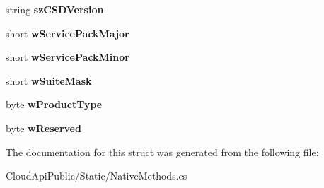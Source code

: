 \begin{DoxyCompactItemize}
\item 
\hypertarget{struct_cloud_api_public_1_1_static_1_1_native_methods_1_1_o_s_v_e_r_s_i_o_n_i_n_f_o_e_x_a8c772de131a2cb6fbf89454b8e3c31dd}{string {\bfseries sz\-C\-S\-D\-Version}}\label{struct_cloud_api_public_1_1_static_1_1_native_methods_1_1_o_s_v_e_r_s_i_o_n_i_n_f_o_e_x_a8c772de131a2cb6fbf89454b8e3c31dd}

\item 
\hypertarget{struct_cloud_api_public_1_1_static_1_1_native_methods_1_1_o_s_v_e_r_s_i_o_n_i_n_f_o_e_x_a70d66e9b3d86a720e90402bc8b2f0dbb}{short {\bfseries w\-Service\-Pack\-Major}}\label{struct_cloud_api_public_1_1_static_1_1_native_methods_1_1_o_s_v_e_r_s_i_o_n_i_n_f_o_e_x_a70d66e9b3d86a720e90402bc8b2f0dbb}

\item 
\hypertarget{struct_cloud_api_public_1_1_static_1_1_native_methods_1_1_o_s_v_e_r_s_i_o_n_i_n_f_o_e_x_aa1a7301bc35700aa81efaace1811fc2f}{short {\bfseries w\-Service\-Pack\-Minor}}\label{struct_cloud_api_public_1_1_static_1_1_native_methods_1_1_o_s_v_e_r_s_i_o_n_i_n_f_o_e_x_aa1a7301bc35700aa81efaace1811fc2f}

\item 
\hypertarget{struct_cloud_api_public_1_1_static_1_1_native_methods_1_1_o_s_v_e_r_s_i_o_n_i_n_f_o_e_x_a19bffc038f11f2aeeee907078c1fba0a}{short {\bfseries w\-Suite\-Mask}}\label{struct_cloud_api_public_1_1_static_1_1_native_methods_1_1_o_s_v_e_r_s_i_o_n_i_n_f_o_e_x_a19bffc038f11f2aeeee907078c1fba0a}

\item 
\hypertarget{struct_cloud_api_public_1_1_static_1_1_native_methods_1_1_o_s_v_e_r_s_i_o_n_i_n_f_o_e_x_adfb0414a775747aec721c594fde35cfc}{byte {\bfseries w\-Product\-Type}}\label{struct_cloud_api_public_1_1_static_1_1_native_methods_1_1_o_s_v_e_r_s_i_o_n_i_n_f_o_e_x_adfb0414a775747aec721c594fde35cfc}

\item 
\hypertarget{struct_cloud_api_public_1_1_static_1_1_native_methods_1_1_o_s_v_e_r_s_i_o_n_i_n_f_o_e_x_a4c12dc6a3c1b9670eecff477434c7cf3}{byte {\bfseries w\-Reserved}}\label{struct_cloud_api_public_1_1_static_1_1_native_methods_1_1_o_s_v_e_r_s_i_o_n_i_n_f_o_e_x_a4c12dc6a3c1b9670eecff477434c7cf3}

\end{DoxyCompactItemize}


The documentation for this struct was generated from the following file\-:\begin{DoxyCompactItemize}
\item 
Cloud\-Api\-Public/\-Static/Native\-Methods.\-cs\end{DoxyCompactItemize}
